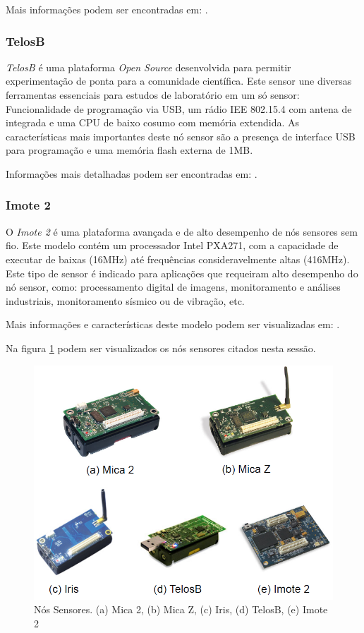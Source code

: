 Mais informações podem ser encontradas em: \cite{Iris}.

\subsubsection{TelosB}
\emph{TelosB} é uma plataforma \emph{Open Source} desenvolvida para permitir experimentação de ponta para a comunidade científica. Este sensor une diversas ferramentas essenciais para estudos de laboratório em um só sensor: Funcionalidade de programação via USB, um rádio IEE 802.15.4 com antena de integrada e uma CPU de baixo cosumo com memória extendida.
As características mais importantes deste nó sensor são a presença de interface USB para programação e uma memória flash externa de 1MB.

Informações mais detalhadas podem ser encontradas em: \cite{TelosB}.

\subsubsection{Imote 2}
O \emph{Imote 2} é uma plataforma avançada e de alto desempenho de nós sensores sem fio. Este modelo contém um processador Intel PXA271, com a capacidade de executar de baixas (16MHz) até frequências consideravelmente altas (416MHz).
Este tipo de sensor é indicado para aplicações que requeiram alto desempenho do nó sensor, como: processamento digital de imagens, monitoramento e análises industriais, monitoramento sísmico ou de vibração, etc.

Mais informações e características deste modelo podem ser visualizadas em: \cite{Imote}.


Na figura \ref{fig:nodes} podem ser visualizados os nós sensores citados nesta sessão.

\begin{figure}[h!]
\centering
\includegraphics[width=12cm]{pictures/sensor_nodes.png}
\caption{Nós Sensores. (a) Mica 2, (b) Mica Z, (c) Iris, (d) TelosB, (e) Imote 2}
 \label{fig:nodes}
\end{figure}